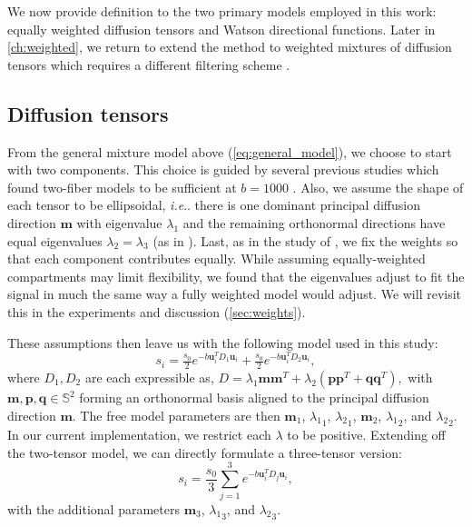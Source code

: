 \documentclass[final,hyperref]{gatech-thesis}
\makeatletter
\renewcommand{\v}[1]{\ensuremath{\mathbf #1}\xspace}
\DeclareRobustCommand\onedot{\futurelet\@let@token\@onedot}
\def\@onedot{\ifx\@let@token.\else.\null\fi\xspace}
\newcommand{\ie}{\textit{i.e}\onedot}
\renewcommand{\S}{\ensuremath{\mathbb S}}
\newcommand{\bn}[1]{\ensuremath{b\!=\!#1}\xspace}
\newcommand{\bone}{\bn{1000}}
\renewcommand{\u}{\v u}
\newcommand{\m}{\v m}
\newcommand{\lx}{{\ensuremath{\lambda_1}} \xspace}
\newcommand{\ly}{{\ensuremath{\lambda_2}} \xspace}
\makeatother
\begin{document}
We now provide definition to the two primary models employed in this work:
equally weighted diffusion tensors \cite{Malcolm2009ipmi,malcolm2010tmi} and
Watson directional functions\cite{Rathi2009mia_w}.  Later in
\autoref{ch:weighted}, we return to extend the method to weighted mixtures of
diffusion tensors which requires a different filtering scheme
\cite{malcolm2009cukf}.



\subsection{Diffusion tensors} \label{sec:equal}

From the general mixture model above (\autoref{eq:general_model}), we choose
to start with two components.  This choice is guided by several previous
studies which found two-fiber models to be sufficient at \bone
\cite{Tuch2002,Kreher2005,Guo2006,Zhan2006,Peled2006,Behrens2007}.
%
Also, we assume the shape of each tensor to be ellipsoidal, \ie there is one
dominant principal diffusion direction \m with eigenvalue \lx and the
remaining orthonormal directions have equal eigenvalues $\ly=\lambda_3$ (as in
\cite{Parker2005,Friman2006,Peled2006,Kaden2007}).
%
Last, as in the study of \cite{Zhan2006}, we fix the weights so that each
component contributes equally.  While assuming equally-weighted compartments
may limit flexibility, we found that the eigenvalues adjust to fit the signal
in much the same way a fully weighted model would adjust.  We will revisit
this in the experiments and discussion (\autoref{sec:weights}).

These assumptions then leave us with the following model used in this study:
\begin{equation} \label{eq:2T_model}
  s_i = \tfrac{s_0}{2} e^{ -b \u_i^T D_1 \u_i } + \tfrac{s_0}{2} e^{ -b \u_i^T D_2 \u_i } ,
\end{equation}
where $D_1,D_2$ are each expressible as,
%
$ D = \lx \m \m^T + \ly\left(\v{p}\v{p}^T + \v{q}\v{q}^T\right), $
%
with $\m,\v{p},\v{q} \in \S^2$ forming an orthonormal basis aligned to the
principal diffusion direction \m.  The free model parameters are then $\m_1$,
$\lx_1$, $\ly_1$, $\m_2$, $\lx_2$, and $\ly_2$.  In our current
implementation, we restrict each $\lambda$ to be positive.  Extending off the
two-tensor model, we can directly formulate a three-tensor version:
\begin{equation}   \label{eq:3T_model}
  s_i = \frac{s_0}{3} \sum_{j=1}^3 e^{-b \u_i^T D_j \u_i } ,
\end{equation}
with the additional parameters $\m_3$, $\lx_3$, and $\ly_3$.
\end{document}
